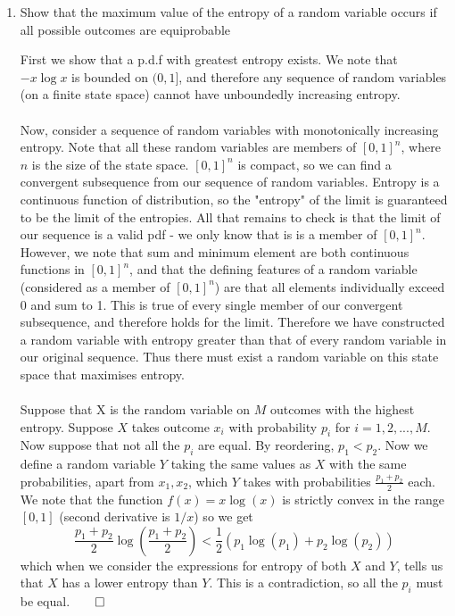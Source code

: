 \documentclass{article}
\newcommand{\chapternumber}{2}
\newenvironment{QandA}{\begin{enumerate}[label=\chapternumber.\arabic*]\bfseries\boldmath}
	{\end{enumerate}}
\newenvironment{answered}{\par\bigskip\normalfont\unboldmath}{}
\begin{document}
\begin{QandA}
	\item Show that the maximum value of the entropy of a random variable occurs if all possible outcomes are equiprobable
	\begin{answered}
		First we show that a p.d.f with greatest entropy exists. We note that $-x\log x$ is bounded on $(0,1]$, and therefore any sequence of random variables (on a finite state space) cannot have unboundedly increasing entropy.\\
		\\
		Now, consider a sequence of random variables with monotonically increasing entropy. Note that all these random variables are members of $[0,1]^n$, where $n$ is the size of the state space. $[0,1]^n$ is compact, so we can find a convergent subsequence from our sequence of random variables. Entropy is a continuous function of distribution, so the "entropy" of the limit is guaranteed to be the limit of the entropies. All that remains to check is that the limit of our sequence is a valid pdf - we only know that is is a member of $[0,1]^n$. However, we note that sum and minimum element are both continuous functions in $[0,1]^n$, and that the defining features of a random variable (considered as a member of $[0,1]^n$) are that all elements individually exceed 0 and sum to 1. This is true of every single member of our convergent subsequence, and therefore holds for the limit. Therefore we have constructed a random variable with entropy greater than that of every random variable in our original sequence. Thus there must exist a random variable on this state space that maximises entropy.\\
		\\
		Suppose that X is the random variable on $M$ outcomes with the highest entropy. Suppose $X$ takes outcome $x_i$ with probability $p_i$ for $i=1,2,...,M$. Now suppose that not all the $p_i$ are equal. By reordering, $p_1< p_2$. Now we define a random variable $Y$ taking the same values as $X$ with the same probabilities, apart from $x_1,x_2$, which $Y$ takes with probabilities $\frac{p_1+p_2}{2}$ each. We note that the function $f(x)=x\log(x)$ is strictly convex in the range $[0,1]$ (second derivative is $1/x$) so we get
		\[\frac{p_1+p_2}{2}\log\left(\frac{p_1+p_2}{2}\right)<\frac{1}{2}(p_1\log(p_1)+p_2\log(p_2))\]
		which when we consider the expressions for entropy of both $X$ and $Y$, tells us that $X$ has a lower entropy than $Y$. This is a contradiction, so all the $p_i$ must be equal.$\qed$
		
	\end{answered}


\end{QandA}
\end{document}

